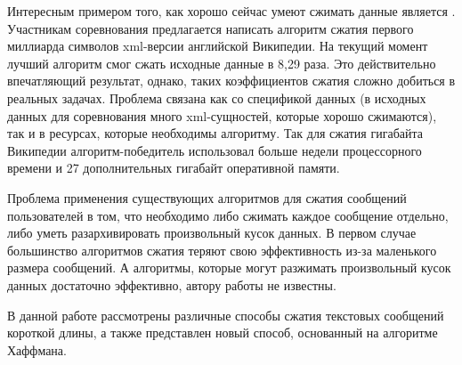 Интересным примером того, как хорошо сейчас умеют сжимать данные является 
\cite{compression-banchmark}. Участникам соревнования предлагается написать алгоритм сжатия первого 
миллиарда символов xml-версии английской Википедии. На текущий момент лучший алгоритм смог сжать исходные 
данные в 8,29 раза. Это действительно впечатляющий результат, однако, таких коэффициентов сжатия сложно 
добиться в реальных задачах. Проблема связана как со спецификой данных (в исходных данных для соревнования
 много xml-сущностей, которые хорошо сжимаются), так и в ресурсах, которые необходимы алгоритму. Так для
  сжатия гигабайта Википедии алгоритм-победитель использовал больше недели процессорного времени и 27
   дополнительных гигабайт оперативной памяти.

Проблема применения существующих алгоритмов для сжатия сообщений пользователей в том, что необходимо либо
 сжимать каждое сообщение отдельно, либо уметь разархивировать произвольный кусок данных. В первом случае 
 большинство алгоритмов сжатия теряют свою эффективность из-за маленького размера сообщений. А алгоритмы,
  которые могут разжимать произвольный кусок данных достаточно эффективно, автору работы не известны.

В данной работе рассмотрены различные способы сжатия текстовых сообщений короткой длины, а также представлен 
новый способ, основанный на алгоритме Хаффмана.